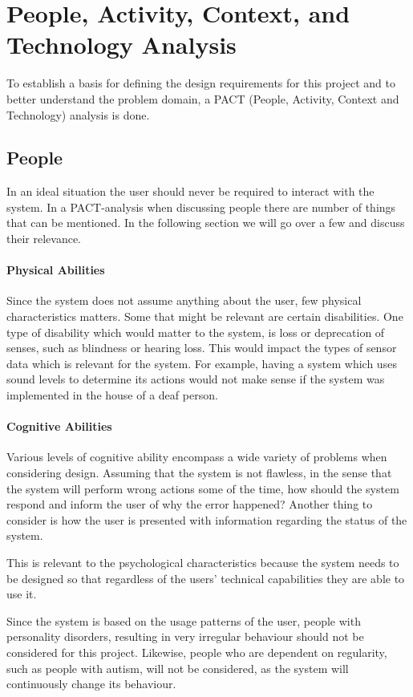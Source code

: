 \section{People, Activity, Context, and Technology Analysis}
To establish a basis for defining the design requirements for this project and
to better understand the problem domain, a PACT (People, Activity, Context and Technology) analysis \cite{DEB} is done.

\subsection{People}
In an ideal situation the user should never be required to interact with the system. In a PACT-analysis when discussing people there are number of things that can be mentioned. In the following section we will go over a few and discuss their relevance.

\paragraph{Physical Abilities}
Since the system does not assume anything about the user, few physical characteristics matters. Some that might be relevant are certain disabilities. One type of disability which would matter to the system, is loss or deprecation of senses, such as blindness or hearing loss. This would impact the types of sensor data which is relevant for the system. For example, having a system which uses sound levels to determine its actions would not make sense if the system was implemented in the house of a deaf person.

\paragraph{Cognitive Abilities}
Various levels of cognitive ability encompass a wide variety of problems
when considering design. Assuming that the system is not flawless, in the
  sense that the system will perform wrong actions some of the time, how should
the system respond and inform the user of why the error happened? Another thing
to consider is how the user is presented with information regarding the status
of the system.

This is relevant to the psychological characteristics because the system needs to be designed so that regardless of the users' technical capabilities they are able to use it.

Since the system is based on the usage patterns of the user, people with personality disorders, resulting in very irregular behaviour should not be considered for this project. Likewise, people who are dependent on regularity, such as people with autism, will not be considered, as the system will continuously change its behaviour.
